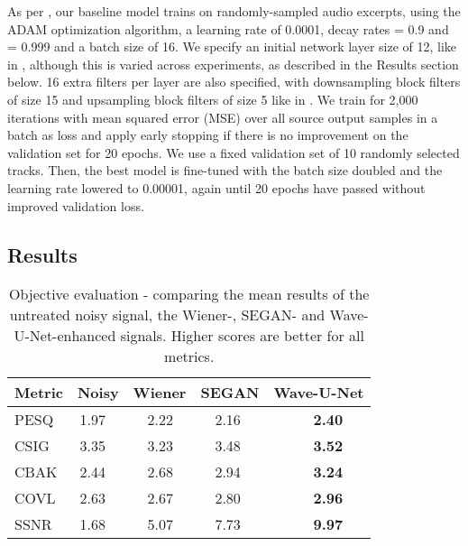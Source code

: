 \documentclass{article}
\begin{document}
As per \citep{Stoller2018Wave-U-Net:Separation}, our baseline model trains on randomly-sampled audio excerpts, using the ADAM optimization algorithm, a learning rate of 0.0001, decay rates  = 0.9 and  = 0.999 and a batch size of 16. 
We specify  
an initial network layer size of 12, like in \citep{Stoller2018Wave-U-Net:Separation}, although this is varied across experiments, as described in the Results section below. 16 extra filters per layer are also specified, with downsampling block filters of size 15 and upsampling block filters of size 5 like in \citep{Stoller2018Wave-U-Net:Separation}. We train for 2,000 iterations with mean squared error (MSE) over all source output samples in a batch as loss and apply early stopping if there is no improvement on the validation set for 20 epochs.  
We use a fixed validation set of 10 randomly selected tracks.
Then, the best model is fine-tuned  with the batch size doubled and the learning rate lowered to 0.00001, again until 20 epochs have passed without improved  validation loss.


\subsection{Results}\label{subsec:results}

\begin{table}
  \caption{Objective evaluation - comparing the mean results of the untreated noisy signal, the Wiener-, SEGAN- and Wave-U-Net-enhanced signals. Higher scores are better for all metrics.}
\label{sample-table}
  \centering
  \begin{tabular}{lllll}
    \toprule
\textbf{Metric}     &\textbf{Noisy}     &\textbf{Wiener}     &\textbf{SEGAN}     &\textbf{Wave-U-Net} \\
    \midrule
    PESQ & \,1.97 & \, \, 2.22 & \, \, 2.16 & \textbf{\, \, \, \, \, 2.40}    \\
    CSIG & \,3.35 & \, \, 3.23 & \, \, 3.48 & \textbf{\, \, \, \, \, 3.52}     \\
    CBAK & \,2.44 & \, \, 2.68 & \, \, 2.94 & \textbf{\, \, \, \, \, 3.24}     \\
    COVL & \,2.63 & \, \, 2.67 & \, \, 2.80 & \textbf{\, \, \, \, \, 2.96}     \\
    SSNR & \,1.68 & \, \, 5.07 & \, \, 7.73 & \textbf{\, \, \, \, \, 9.97}     \\
    
\bottomrule
  \end{tabular}
\end{table}
\end{document}
